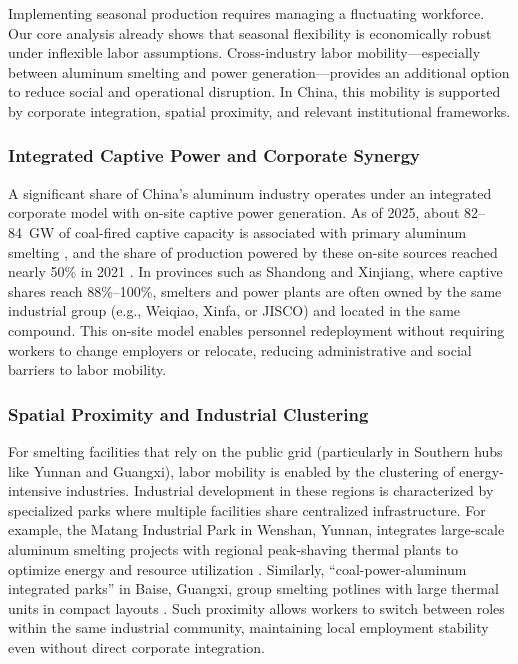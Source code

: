 \documentclass[preprint,12pt]{elsarticle}
\begin{document}
Implementing seasonal production requires managing a fluctuating workforce. Our core analysis already shows that seasonal flexibility is economically robust under inflexible labor assumptions. Cross-industry labor mobility---especially between aluminum smelting and power generation---provides an additional option to reduce social and operational disruption. In China, this mobility is supported by corporate integration, spatial proximity, and relevant institutional frameworks.

\subsubsection{Integrated Captive Power and Corporate Synergy}
A significant share of China's aluminum industry operates under an integrated corporate model with on-site captive power generation. As of 2025, about 82--84~GW of coal-fired captive capacity is associated with primary aluminum smelting \citep{ember_aluminium_coal_2025, transitionasia_aluminium_2025}, and the share of production powered by these on-site sources reached nearly 50\% in 2021 \citep{tan_different_2025}. In provinces such as Shandong and Xinjiang, where captive shares reach 88\%--100\%, smelters and power plants are often owned by the same industrial group (e.g., Weiqiao, Xinfa, or JISCO) and located in the same compound. This on-site model enables personnel redeployment without requiring workers to change employers or relocate, reducing administrative and social barriers to labor mobility.

\subsubsection{Spatial Proximity and Industrial Clustering}
For smelting facilities that rely on the public grid (particularly in Southern hubs like Yunnan and Guangxi), labor mobility is enabled by the clustering of energy-intensive industries. Industrial development in these regions is characterized by specialized parks where multiple facilities share centralized infrastructure. For example, the Matang Industrial Park in Wenshan, Yunnan, integrates large-scale aluminum smelting projects with regional peak-shaving thermal plants to optimize energy and resource utilization \citep{chinadaily_weiqiao_2020, yieh_wenshan_2020}. Similarly, ``coal-power-aluminum integrated parks'' in Baise, Guangxi, group smelting potlines with large thermal units in compact layouts \citep{industrialinfo_guangxi_2024}. Such proximity allows workers to switch between roles within the same industrial community, maintaining local employment stability even without direct corporate integration.
\end{document}
